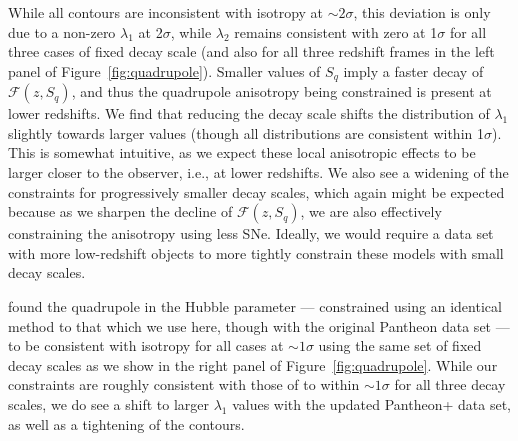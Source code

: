 \documentclass[fleqn,usenatbib]{mnras}
\newcommand{\jess}[1]{\textcolor{magenta} {\textbf{[JAC]:{#1}}}}
\begin{document}
{While all contours are inconsistent with isotropy at {$\sim 2\sigma$,}
this deviation is only due to a non-zero $\lambda_1$ at 2$\sigma$, {while $\lambda_2$ remains consistent with zero at 1$\sigma$ for all three cases of fixed decay scale (and also for all three redshift frames in the left panel of Figure~\ref{fig:quadrupole}). }}
{Smaller values of $S_q$ imply a faster decay of $\mathcal{F}(z,S_q)$, and thus the quadrupole anisotropy being constrained is present at lower redshifts. We find that }
reducing the decay scale shifts the distribution of $\lambda_1$ {slightly} towards larger values {(though all distributions are consistent within 1$\sigma$)}. This is somewhat intuitive, 
{as} we expect these {local anisotropic} effects to %
{be larger closer to the observer, i.e., at lower redshifts}.
We also see {a widening of the constraints} %
for %
{progressively} smaller decay scales, which {again might} be expected because as we {sharpen the decline of $\mathcal{F}(z,S_q)$,}
we are {also effectively} constraining the anisotropy using less {SNe}.
Ideally, we would require a data set with more low-redshift objects to %
{more tightly} constrain these model{s with small decay scales}. 

{ found the quadrupole in the Hubble parameter --- constrained using an identical method to that which we use here, though with the original Pantheon data set --- to be consistent with isotropy for all cases at $\sim 1\sigma$ using the same set of fixed decay scales as we show in the right panel of Figure~\ref{fig:quadrupole}. While our constraints are roughly consistent with those of  to within $\sim 1\sigma$ for all three decay scales, we do see a shift to larger $\lambda_1$ values with the updated Pantheon+ data set, as well as a tightening of the contours.}
\end{document}
